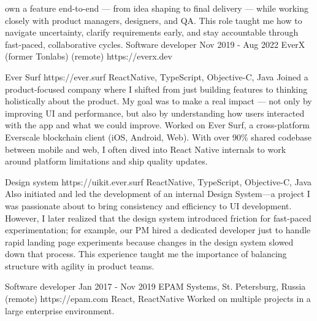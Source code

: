 \documentclass[11pt,a4paper,sans]{awesomecv}
\begin{document}
\begin{cventries}
{{          own a feature end-to-end — from idea shaping to final delivery — while working closely with product managers, designers, and QA.
          \hfill \break
          \hfill \break
          This role taught me how to navigate uncertainty, clarify requirements early, and 
          stay accountable through fast-paced, collaborative cycles.
          \hfill \break
          \hfill \break
        }
    }
\cventry
    {Software developer}
    {Nov 2019 - Aug 2022}
    {EverX (former Tonlabs) (remote)}
    {https://everx.dev}
    {
      \begin{cvprojects}{0.8ex}
      \item \cvproject
        {Ever Surf}
        {https://ever.surf}{}
        {ReactNative, TypeScript, Objective-C, Java}
        {
          Joined a product-focused company where I shifted from just building features to 
          thinking holistically about the product. My goal was to make a real impact — not 
          only by improving UI and performance, but also by understanding how users 
          interacted with the app and what we could improve.
          \hfill \break
          \hfill \break
          Worked on Ever Surf, a cross-platform Everscale blockchain client (iOS, Android, Web). 
          With over 90\% shared codebase between mobile and web, I often dived into React Native 
          internals to work around platform limitations and ship quality updates.
        }
      \item \cvproject
        {Design system}
        {https://uikit.ever.surf}{}
        {ReactNative, TypeScript, Objective-C, Java}
        {
          Also initiated and led the development of an internal Design System—a project 
          I was passionate about to bring consistency and efficiency to UI development. 
          However, I later realized that the design system introduced friction for 
          fast-paced experimentation; for example, our PM hired a dedicated developer 
          just to handle rapid landing page experiments because changes in the design 
          system slowed down that process. This experience taught me the importance 
          of balancing structure with agility in product teams.
        }
      \end{cvprojects}
      \hfill \break
      \hfill \break
    }
\cventry
    {Software developer}
    {Jan 2017 - Nov 2019}
    {EPAM Systems, St. Petersburg, Russia (remote)}
    {https://epam.com}
    {
      \cvproject
        {}{}{}
        {React, ReactNative}
        {
          Worked on multiple projects in a large enterprise environment. 
}}
\end{cventries}
\end{document}
